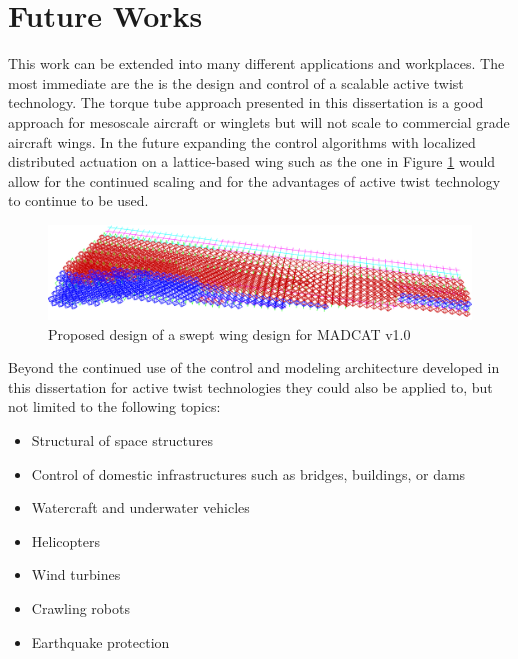 \documentclass[11pt]{ucthesis}
\begin{document}
\section{Future Works}
This work can be extended into many different applications and workplaces. The most immediate are the is the design and control of a scalable active twist technology. The torque tube approach presented in this dissertation is a good approach for mesoscale aircraft or winglets but will not scale to commercial grade aircraft wings. In the future expanding the control algorithms with localized distributed actuation on a lattice-based wing such as the one in Figure \ref{fig:MADCAT} would allow for the continued scaling and for the advantages of active twist technology to continue to be used.

\begin{figure}[thpb]
\centering
\includegraphics[width=0.75\linewidth]{./Figures/MADCATSwept.png}
\caption{Proposed design of a swept wing design for MADCAT v1.0}
\label{fig:MADCAT}
\end{figure}

Beyond the continued use of the control and modeling architecture developed in this dissertation for active twist technologies they could also be applied to, but not limited to the following topics:

\begin{itemize}
\item Structural of space structures
\item Control of domestic infrastructures such as bridges, buildings, or dams
\item Watercraft and underwater vehicles
\item Helicopters
\item Wind turbines
\item Crawling robots
\item Earthquake protection
\end{itemize}


\nocite{*}



\appendix
\end{document}
